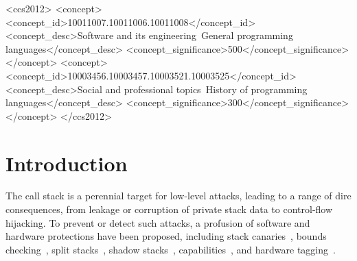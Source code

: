 \documentclass[acmsmall,review,anonymous]{acmart}\settopmatter{printfolios=true,printccs=false,printacmref=false}
\begin{document}
\begin{CCSXML}
<ccs2012>
<concept>
<concept_id>10011007.10011006.10011008</concept_id>
<concept_desc>Software and its engineering~General programming languages</concept_desc>
<concept_significance>500</concept_significance>
</concept>
<concept>
<concept_id>10003456.10003457.10003521.10003525</concept_id>
<concept_desc>Social and professional topics~History of programming languages</concept_desc>
<concept_significance>300</concept_significance>
</concept>
</ccs2012>
\end{CCSXML}



\ifcameraready
{}  %
\fi


\maketitle

\newcommand{\paragraphx}[1]{\emph{#1.}}

\section{Introduction}

The call stack is a perennial target for low-level attacks, leading to a
range of dire consequences, from leakage or corruption of private stack data
to control-flow hijacking. To prevent or detect such attacks, a profusion of
software and hardware protections have been proposed,
%
including stack canaries~\citep{Cowan+98},
bounds checking~\citep{NagarakatteZMZ09,NagarakatteZMZ10,DeviettiBMZ08},
split stacks~\citep{Kuznetsov+14},
shadow stacks~\citep{Dang+15,Shanbhogue+19},
capabilities~\citep{Woodruff+14,Chisnall+15,SkorstengaardLocal,SkorstengaardSTKJFP,Georges+21},
and hardware tagging~\citep{DBLP:conf/sp/RoesslerD18}. \ifaftersubmission{}
\fi
\end{document}

